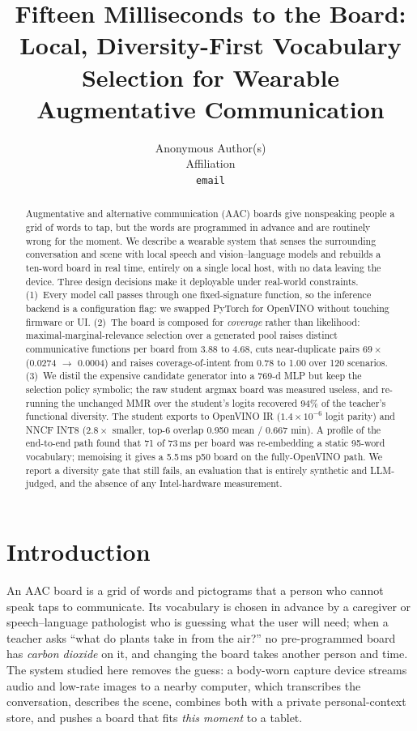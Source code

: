 \documentclass{article}
\title{Fifteen Milliseconds to the Board: Local, Diversity-First Vocabulary
Selection for Wearable Augmentative Communication}
\author{Anonymous Author(s)\\Affiliation\\\texttt{email}}
\begin{document}
\maketitle

\begin{abstract}
Augmentative and alternative communication (AAC) boards give nonspeaking people
a grid of words to tap, but the words are programmed in advance and are
routinely wrong for the moment. We describe a wearable system that senses the
surrounding conversation and scene with local speech and vision--language
models and rebuilds a ten-word board in real time, entirely on a single local
host, with no data leaving the device. Three design decisions make it
deployable under real-world constraints. (1)~Every model call passes through
one fixed-signature function, so the inference backend is a configuration flag:
we swapped PyTorch for OpenVINO without touching firmware or UI. (2)~The board is
composed for \emph{coverage} rather than likelihood: maximal-marginal-relevance
selection over a generated pool raises distinct communicative functions per
board from 3.88 to 4.68, cuts near-duplicate pairs $69\times$ (0.0274
$\rightarrow$ 0.0004) and raises coverage-of-intent from 0.78 to 1.00 over 120
scenarios. (3)~We distil the expensive candidate generator into a 769-d MLP but
keep the selection policy symbolic; the raw student argmax board was measured
useless, and re-running the unchanged MMR over the student's logits recovered
94\% of the teacher's functional diversity. The student exports to OpenVINO IR
($1.4\times10^{-6}$ logit parity) and NNCF INT8 ($2.8\times$ smaller, top-6
overlap 0.950 mean / 0.667 min). A profile of the end-to-end path found that 71
of 73\,ms per board was re-embedding a static 95-word vocabulary; memoising it
gives a 5.5\,ms p50 board on the fully-OpenVINO path. We report a diversity gate
that still fails, an evaluation that is entirely synthetic and LLM-judged, and
the absence of any Intel-hardware measurement.
\end{abstract}

\section{Introduction}

An AAC board is a grid of words and pictograms that a person who cannot speak
taps to communicate. Its vocabulary is chosen in advance by a caregiver or
speech--language pathologist who is guessing what the user will need; when a
teacher asks ``what do plants take in from the air?'' no pre-programmed board
has \emph{carbon dioxide} on it, and changing the board takes another person and
time. The system studied here removes the guess: a body-worn capture device
streams audio and low-rate images to a nearby computer, which transcribes the
conversation, describes the scene, combines both with a private personal-context
store, and pushes a board that fits \emph{this moment} to a tablet.
\end{document}
